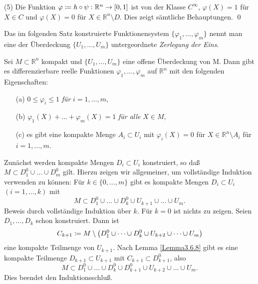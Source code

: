 \documentclass[a4paper,twoside,DIV15,BCOR12mm]{scrbook}
\begin{document}
\noindent
(5) Die Funktion $\varphi \da  h \circ \psi: {\mathbb R}^{n} \to [0,1]$ 
ist von der Klasse $C^{\infty}$, $\varphi(X) = 1$ für $X \in C$ und 
$\varphi(X) = 0$ für $X \in {\mathbb R}^{n} \setminus D$. Dies zeigt 
sämtliche Behauptungen. \qed\\

\bigskip

\noindent
Das im folgenden Satz konstruierte Funktionensystem 
$\{\varphi_{1},\dots,\varphi_{m}\}$ nennt man eine der Überdeckung 
$\{U_{1},\dots,U_{m}\}$ untergeordnete {\em Zerlegung der Eins}.\\

\bigskip

\begin{satz}\label{Satz3.6.10} {Sei $M \subset {\mathbb R}^{n}$ 
kompakt und $\{U_{1},\dots,U_{m}\}$ eine offene Überdeckung von M. 
Dann gibt es differenzierbare reelle Funktionen 
$\varphi_{1},\dots,\varphi_{m}$ auf ${\mathbb R}^{n}$ mit den 
folgenden Eigenschaften:}
\begin{enumerate}
\item[{\rm (a)}] $0 \le \varphi_{i} \le 1$ {\em für} $i = 1,\dots,m$,
\item[{\rm (b)}] $\varphi_{1}(X) + \dots + \varphi_{m}(X) = 1$ {\em für alle} $X 
\in M$,
\item[{\rm (c)}] {es gibt eine kompakte Menge $A_{i} \subset U_{i}$ mit 
$\varphi_{i}(X) = 0$ für $X \in {\mathbb R}^{n} \setminus A_{i}$ 
für $i = 1,\dots,m$.}
\end{enumerate}
\end{satz}

\bigskip

 Zunächst werden kompakte Mengen $D_{i} 
\subset U_{i}$ konstruiert, so daß $M \subset D_{1}^{0} \cup \dots 
\cup D_{m}^{0}$ gilt. Hierzu zeigen wir allgemeiner, um vollständige 
Induktion verwenden zu können: Für $k \in \{0,\dots,m\}$ gibt es 
kompakte Mengen $D_{i} \subset U_{i}$ $(i = 1,\dots,k)$ mit
\[ M \subset D_{1}^{0} \cup \dots \cup D_{k}^{0} \cup U_{k+1} \cup 
\dots \cup U_{m}. \]
Beweis durch vollständige Induktion über $k$. Für $k = 0$ ist 
nichts zu zeigen. Seien $D_{1},\dots,D_{k}$ schon konstruiert. Dann 
ist 
\[ C_{k+1} \da  M \setminus \left(D_{1}^{0} \cup \dots \cup D_{k}^{0} 
\cup U_{k+2} \cup \dots \cup U_{m}\right) \]
eine kompakte Teilmenge von $U_{k+1}$. Nach Lemma \ref{Lemma3.6.8} gibt es eine 
kompakte Teilmenge $D_{k+1} \subset U_{k+1}$ mit $C_{k+1} \subset 
D_{k+1}^{0}$, also
\[ M \subset D_{1}^{0} \cup \dots \cup D_{k}^{0} \cup D_{k+1}^{0} \cup 
U_{k+2} \cup \dots \cup U_{m}. \]
Dies beendet den Induktionsschluß.\\
\end{document}
